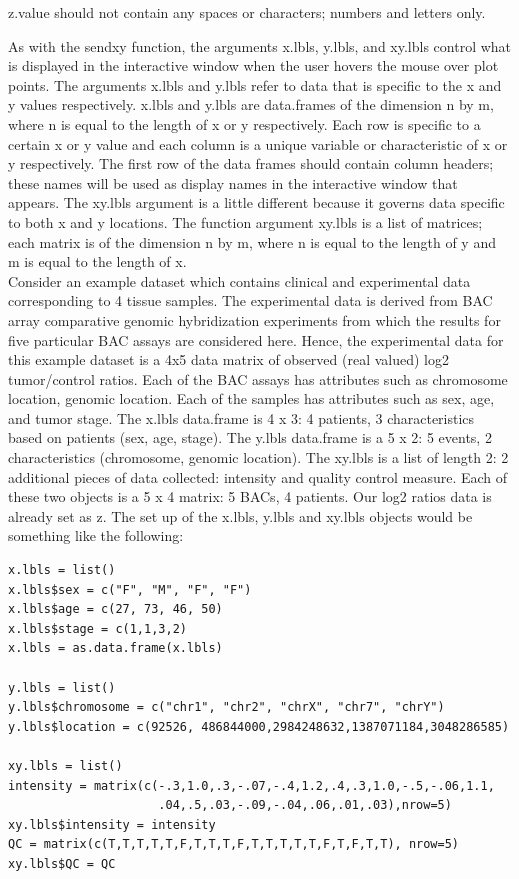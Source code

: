 \documentclass[]{article}
\begin{document}
 z.value should not contain any spaces or characters; numbers and letters only.

\indent As with the sendxy function, the arguments x.lbls, y.lbls, and xy.lbls control what is displayed in the interactive window when the user hovers the mouse over plot points. The arguments x.lbls and y.lbls refer to data that is specific to the x and y values respectively. x.lbls and y.lbls are data.frames of the dimension n by m, where n is equal to the length of x or y respectively. Each row is specific to a certain x or y value and each column is a unique variable or characteristic of x or y respectively.  The first row of the data frames should contain column headers; these names will be used as display names in the interactive window that appears. The xy.lbls argument is a little different because it governs data specific to both x and y locations. The function argument xy.lbls is a list of matrices; each matrix is of the dimension n by m, where n is equal to the length of y and m is equal to the length of x.\\ 

\indent Consider an example dataset which contains clinical and experimental data corresponding to 4 tissue samples. The experimental data is derived from BAC array comparative genomic hybridization experiments from which the results for five particular BAC assays are considered here. Hence, the experimental data for this example dataset is a 4x5 data matrix of observed (real valued) log2 tumor/control ratios. Each of the BAC assays has attributes such as chromosome location, genomic location. Each of the samples has attributes such as sex, age, and tumor stage. The x.lbls data.frame is 4 x 3: 4 patients, 3 characteristics based on patients (sex, age, stage). The y.lbls data.frame is a 5 x 2: 5 events, 2 characteristics (chromosome, genomic location).  The xy.lbls is a list of length 2: 2 additional pieces of data collected: intensity and quality control measure. Each of these two objects is a 5 x 4 matrix: 5 BACs, 4 patients. Our log2 ratios data is already set as z. The set up of the x.lbls, y.lbls and xy.lbls objects would be something like the following:

\begin{verbatim}
x.lbls = list()
x.lbls$sex = c("F", "M", "F", "F")
x.lbls$age = c(27, 73, 46, 50)
x.lbls$stage = c(1,1,3,2)
x.lbls = as.data.frame(x.lbls)

y.lbls = list()
y.lbls$chromosome = c("chr1", "chr2", "chrX", "chr7", "chrY")
y.lbls$location = c(92526, 486844000,2984248632,1387071184,3048286585)

xy.lbls = list()
intensity = matrix(c(-.3,1.0,.3,-.07,-.4,1.2,.4,.3,1.0,-.5,-.06,1.1,
                     .04,.5,.03,-.09,-.04,.06,.01,.03),nrow=5)
xy.lbls$intensity = intensity
QC = matrix(c(T,T,T,T,T,F,T,T,T,F,T,T,T,T,T,F,T,F,T,T), nrow=5)
xy.lbls$QC = QC

\end{verbatim}
\end{document}
